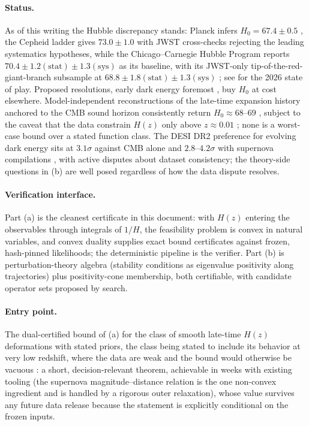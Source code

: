 \documentclass[11pt,letterpaper]{article}
\begin{document}
\paragraph{Status.} As of this writing the Hubble discrepancy stands: Planck infers $H_0=67.4\pm0.5$ \cite{planck2018}, the Cepheid ladder gives $73.0\pm1.0$ \cite{riess2022} with JWST cross-checks rejecting the leading systematics hypotheses, while the Chicago--Carnegie Hubble Program reports $70.4\pm1.2(\mathrm{stat})\pm1.3(\mathrm{sys})$ as its baseline, with its JWST-only tip-of-the-red-giant-branch subsample at $68.8\pm1.8(\mathrm{stat})\pm1.3(\mathrm{sys})$ \cite{freedman2025}; see \cite{cai2026,kamionkowskiriess2023} for the 2026 state of play. Proposed resolutions, early dark energy foremost \cite{poulin2023}, buy $H_0$ at cost elsewhere. Model-independent reconstructions of the late-time expansion history anchored to the CMB sound horizon consistently return $H_0\approx68$--$69$ \cite{lemos2019,keeleyshafieloo2023,zhou2025,sabogal2026}, subject to the caveat that the data constrain $H(z)$ only above $z\approx0.01$ \cite{efstathiou2021}; none is a worst-case bound over a stated function class. The DESI DR2 preference for evolving dark energy sits at $3.1\sigma$ against CMB alone and $2.8$--$4.2\sigma$ with supernova compilations \cite{desi2025}, with active disputes about dataset consistency; the theory-side questions in (b) are well posed regardless of how the data dispute resolves.

\paragraph{Verification interface.} Part (a) is the cleanest certificate in this document: with $H(z)$ entering the observables through integrals of $1/H$, the feasibility problem is convex in natural variables, and convex duality supplies exact bound certificates against frozen, hash-pinned likelihoods; the deterministic pipeline is the verifier. Part (b) is perturbation-theory algebra (stability conditions as eigenvalue positivity along trajectories) plus positivity-cone membership, both certifiable, with candidate operator sets proposed by search.

\paragraph{Entry point.} The dual-certified bound of (a) for the class of smooth late-time $H(z)$ deformations with stated priors, the class being stated to include its behavior at very low redshift, where the data are weak and the bound would otherwise be vacuous \cite{efstathiou2021}: a short, decision-relevant theorem, achievable in weeks with existing tooling (the supernova magnitude--distance relation is the one non-convex ingredient and is handled by a rigorous outer relaxation), whose value survives any future data release because the statement is explicitly conditional on the frozen inputs.
\end{document}
